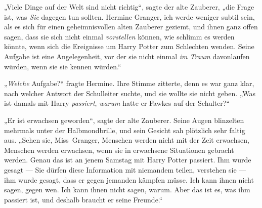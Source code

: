 „Viele Dinge auf der Welt sind nicht richtig“, sagte der alte Zauberer, „die Frage ist, was \emph{Sie} dagegen tun sollten. Hermine Granger, ich werde weniger subtil sein, als es sich für einen geheimnisvollen alten Zauberer geziemt, und ihnen ganz offen sagen, dass sie sich nicht einmal \emph{vorstellen} können, wie schlimm es werden könnte, wenn sich die Ereignisse um Harry Potter zum Schlechten wenden. Seine Aufgabe ist eine Angelegenheit, vor der sie nicht einmal \emph{im Traum} davonlaufen würden, wenn sie sie kennen würden.“

„\emph{Welche} Aufgabe?“ fragte Hermine. Ihre Stimme zitterte, denn es war ganz klar, nach welcher Antwort der Schulleiter suchte, und sie wollte sie nicht geben.
„Was ist damals mit Harry \emph{passiert}, \emph{warum} hatte er Fawkes auf der Schulter?“

„Er ist erwachsen geworden“, sagte der alte Zauberer. Seine Augen blinzelten mehrmals unter der Halbmondbrille, und sein Gesicht sah plötzlich sehr faltig aus.
„Sehen sie, Miss~Granger, Menschen werden nicht mit der Zeit erwachsen, Menschen werden erwachsen, wenn sie in erwachsene Situationen gebracht werden. Genau das ist an jenem Samstag mit Harry Potter passiert. Ihm wurde gesagt — Sie dürfen diese Information mit niemandem teilen, verstehen sie — ihm wurde gesagt, dass er gegen jemanden kämpfen müsse. Ich kann ihnen nicht sagen, gegen wen. Ich kann ihnen nicht sagen, warum. Aber das ist es, was ihm passiert ist, und deshalb braucht er seine Freunde.“

